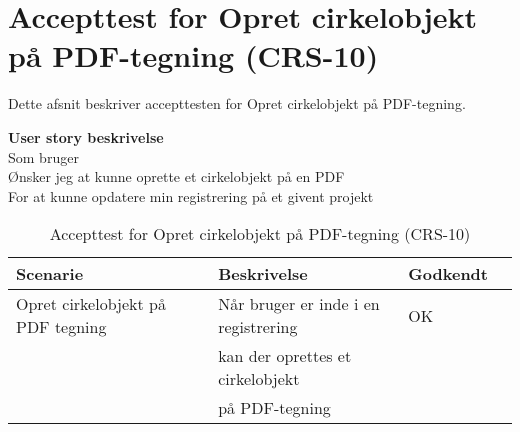 \section{Accepttest for Opret cirkelobjekt på PDF-tegning (CRS-10)}
Dette afsnit beskriver accepttesten for Opret cirkelobjekt på PDF-tegning.

\textbf{User story beskrivelse} \\
Som bruger \\
Ønsker jeg at kunne oprette et cirkelobjekt på en PDF \\
For at kunne opdatere min registrering på et givent projekt

\begin{table}[H]
	\centering
	\begin{tabular}{|ll|l|ll|} \hline
		\textbf{Scenarie} &  & \textbf{Beskrivelse}&  \textbf{Godkendt}&  \\ \hline
		Opret cirkelobjekt på PDF tegning&  &  Når bruger er inde i en registrering &  OK&  \\
		& & kan der oprettes et cirkelobjekt& & \\ 
		& & på PDF-tegning& & \\ \hline
	\end{tabular}
	\caption{Accepttest for Opret cirkelobjekt på PDF-tegning (CRS-10)}
	\label{AcceptCirkel}
\end{table}
